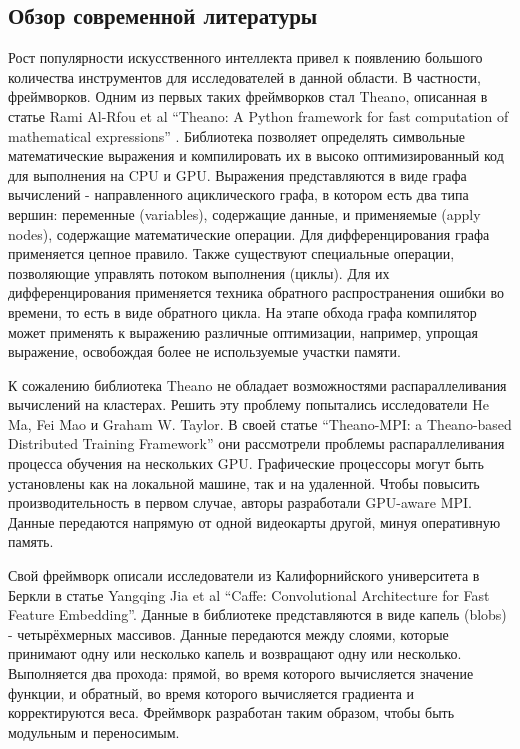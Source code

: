 \subsection{Обзор современной литературы}
	Рост популярности искусственного интеллекта привел к появлению большого количества инструментов для исследователей в данной области. В частности, фреймворков. Одним из первых таких фреймворков стал Theano, описанная в статье Rami Al-Rfou et al “Theano: A Python framework for fast computation of mathematical expressions”\cite{theano} . Библиотека позволяет определять символьные математические выражения и компилировать их в высоко оптимизированный код для выполнения на CPU и GPU. Выражения представляются в виде графа вычислений - направленного ациклического графа, в котором есть два типа вершин: переменные (variables), содержащие данные, и применяемые (apply nodes), содержащие математические операции. Для дифференцирования графа применяется цепное правило. Также существуют специальные операции, позволяющие управлять потоком выполнения (циклы). Для их дифференцирования применяется техника обратного распространения ошибки во времени, то есть в виде обратного цикла. На этапе обхода графа компилятор может применять к выражению различные оптимизации, например, упрощая выражение, освобождая более не используемые участки памяти.
\par
К сожалению библиотека Theano не обладает возможностями распараллеливания вычислений на кластерах. Решить эту проблему попытались исследователи He Ma, Fei Mao и Graham W. Taylor. В своей статье “Theano-MPI: a Theano-based Distributed Training Framework”\cite{theanompi} они рассмотрели проблемы распараллеливания процесса обучения на нескольких GPU. Графические процессоры могут быть установлены как на локальной машине, так и на удаленной. Чтобы повысить производительность в первом случае, авторы разработали GPU-aware MPI. Данные передаются напрямую от одной видеокарты другой, минуя оперативную память.
\par
Свой фреймворк описали исследователи из Калифорнийского университета в Беркли в статье Yangqing Jia et al “Caffe: Convolutional Architecture for Fast Feature Embedding”\cite{caffe}. Данные в библиотеке представляются в виде капель (blobs) - четырёхмерных массивов. Данные передаются между слоями, которые принимают одну или несколько капель и возвращают одну или несколько. Выполняется два прохода: прямой, во время которого вычисляется значение функции, и обратный, во время которого вычисляется градиента и корректируются веса. Фреймворк разработан таким образом, чтобы быть модульным и переносимым.
